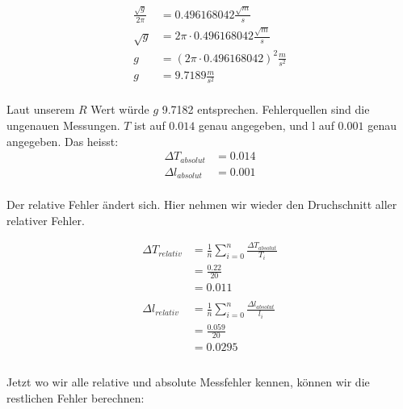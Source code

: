 \documentclass[12pt, a4paper, twoside]{article}
\begin{document}
\begin{align*}
  \frac{\sqrt{g}}{2\pi} & = 0.496168042\frac{\sqrt{m}}{s}           \\
  \sqrt{g}              & = 2\pi\cdot 0.496168042\frac{\sqrt{m}}{s} \\
  g                     & = (2\pi\cdot0.496168042)^2\frac{m}{s^2}   \\
  g                     & = 9.7189\frac{m}{s^2}                     \\
\end{align*}

Laut unserem $R$ Wert würde $g$ 9.7182 entsprechen. Fehlerquellen sind die ungenauen Messungen.
$T$ ist auf $0.014$ genau angegeben, und l auf $0.001$ genau angegeben.
Das heisst:
\begin{align*}
  \Delta T_{absolut} & = 0.014 \\
  \Delta l_{absolut} & = 0.001 \\
\end{align*}

Der relative Fehler ändert sich. Hier nehmen wir wieder den Druchschnitt aller relativer Fehler.

\begin{align*}
  \Delta T_{relativ} & = \frac{1}{n}\sum_{i=0}^{n}\frac{\Delta T_{absolut}}{T_i} \\
                     & = \frac{0.22}{20}                                         \\
                     & = 0.011                                                   \\
  \\
  \Delta l_{relativ} & = \frac{1}{n}\sum_{i=0}^{n}\frac{\Delta l_{absolut}}{l_i} \\
                     & = \frac{0.059}{20}                                        \\
                     & = 0.0295                                                  \\
  \\
\end{align*}

Jetzt wo wir alle relative und absolute Messfehler kennen, können wir die restlichen Fehler berechnen:
\end{document}
